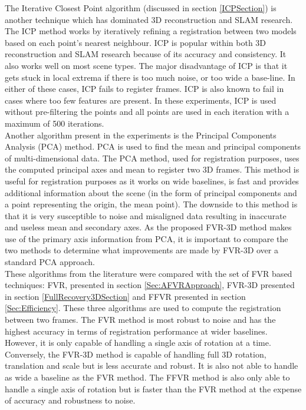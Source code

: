 The Iterative Closest Point algorithm (discussed in section \ref{ICPSection}) is another technique which has dominated 3D reconstruction and SLAM research. The ICP method works by iteratively refining a registration between two models based on each point's nearest neighbour. ICP is popular within both 3D reconstruction and SLAM research because of its accuracy and consistency. It also works well on most scene types. The major disadvantage of ICP is that it gets stuck in local extrema if there is too much noise, or too wide a base-line. In either of these cases, ICP fails to register frames. ICP is also known to fail in cases where too few features are present. In these experiments, ICP is used without pre-filtering the points and all points are used in each iteration with a maximum of 500 iterations. \\

Another algorithm present in the experiments is the Principal Components Analysis (PCA) method. PCA is used to find the mean and principal components of multi-dimensional data. The PCA method, used for registration purposes, uses the computed principal axes and mean to register two 3D frames. This method is useful for registration purposes as it works on wide baselines, is fast and provides additional information about the scene (in the form of principal components and a point representing the origin, the mean point). The downside to this method is that it is very susceptible to noise and misaligned data resulting in inaccurate and useless mean and secondary axes. As the proposed FVR-3D method makes use of the primary axis information from PCA, it is important to compare the two methods to determine what improvements are made by FVR-3D over a standard PCA approach. \\

These algorithms from the literature were compared with the set of FVR based techniques: FVR, presented in section \ref{Sec:AFVRApproach}, FVR-3D presented in section \ref{FullRecovery3DSection} and FFVR presented in section \ref{Sec:Efficiency}. These three algorithms are used to compute the registration between two frames. The FVR method is most robust to noise and has the highest accuracy in terms of registration performance at wider baselines. However, it is only capable of handling a single axis of rotation at a time. Conversely, the FVR-3D method is capable of handling full 3D rotation, translation and scale but is less accurate and robust. It is also not able to handle as wide a baseline as the FVR method. The FFVR method is also only able to handle a single axis of rotation but is faster than the FVR method at the expense of accuracy and robustness to noise. \\
